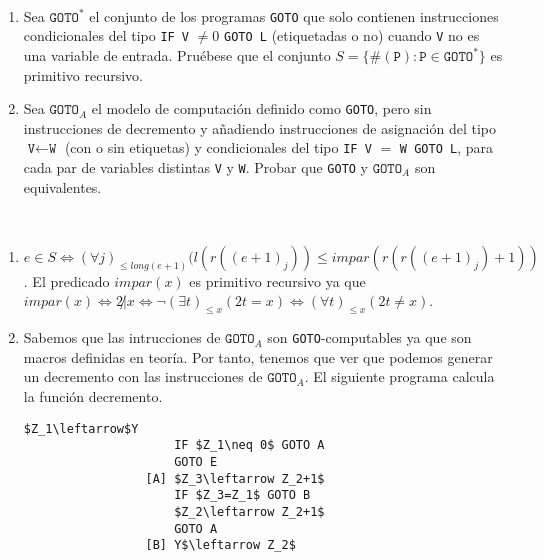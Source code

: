 \documentclass[twoside]{article}
\begin{document}
\newpage

\begin{ejercicio}{3}
\end{ejercicio}\
\begin{enumerate}
\item Sea $\texttt{GOTO}^*$ el conjunto de los programas \texttt{GOTO} que solo contienen instrucciones condicionales
del tipo \texttt{IF V} $\neq 0$ \texttt{GOTO L} (etiquetadas o no) cuando \texttt{V} no es una variable de
entrada. Pruébese que el conjunto $S = \{\#(\texttt{P}) : \texttt{P} \in \texttt{GOTO}^*\}$ es primitivo recursivo.

\item Sea $\texttt{GOTO}_A$ el modelo de computación definido como \texttt{GOTO}, pero sin instrucciones de
decremento y añadiendo instrucciones de asignación del tipo $\texttt{V}\leftarrow \texttt{W}$ (con o sin etiquetas)
y condicionales del tipo \texttt{IF V} $=$ \texttt{W GOTO L}, para cada par de variables distintas \texttt{V} y \texttt{W}.
Probar que \texttt{GOTO} y $\texttt{GOTO}_A$ son equivalentes.
\end{enumerate}
\begin{solucion}\
\begin{enumerate}
\item $e\in S\Leftrightarrow (\forall j)_{\leq long(e+1)}(l(r((e+1)_j))\leq impar(r(r((e+1)_j)+1))$. El predicado $impar(x)$ es primitivo recursivo ya que $impar(x)\Leftrightarrow 2\not| x\Leftrightarrow \neg (\exists t)_{\leq x}(2t=x)\Leftrightarrow (\forall t)_{\leq x}(2t\neq x)$. 
\item Sabemos que las intrucciones de $\texttt{GOTO}_A$ son \texttt{GOTO}-computables ya que son macros definidas en teoría. Por tanto, tenemos que ver que podemos generar un decremento con las instrucciones de $\texttt{GOTO}_A$. El siguiente programa calcula la función decremento.
\begin{lstlisting}[mathescape=true]
                     $Z_1\leftarrow$Y
                     IF $Z_1\neq 0$ GOTO A
                     GOTO E
                 [A] $Z_3\leftarrow Z_2+1$
                     IF $Z_3=Z_1$ GOTO B
                     $Z_2\leftarrow Z_2+1$
                     GOTO A
                 [B] Y$\leftarrow Z_2$  
\end{lstlisting}

\end{enumerate}
\end{solucion}

\newpage
\end{document}
